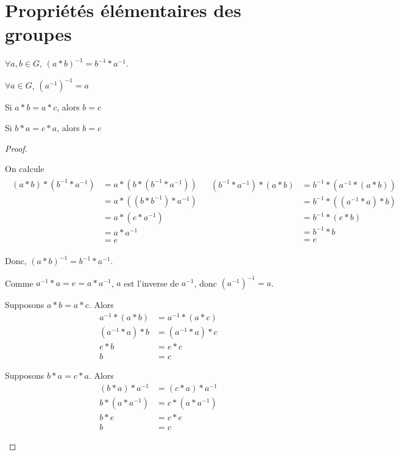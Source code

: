 \documentclass{report}
\theoremstyle{definition}
\theoremstyle{remark}
\begin{document}
	\section*{Propri\'et\'es \'el\'ementaires des groupes}
	\begin{nlist}
		\item $\forall a,b \in G$, $(a*b)^{-1} = b^{-1}*a^{-1}$.
		\item $\forall a \in G$, $(a^{-1})^{-1}=a$
		\item Si $a*b=a*c$, alors $b=c$
		\item Si $b*a=c*a$, alors $b=c$
	\end{nlist}
	\begin{proof}~

		\begin{nlist}
			\item On calcule
			\begin{align*}
				\begin{split}
					(a*b)*(b^{-1}*a^{-1})&= a*(b*(b^{-1}*a^{-1}))\\
					&= a*((b*b^{-1})*a^{-1})\\
					&= a*(e*a^{-1})\\
					&= a*a^{-1}\\
					&= e
				\end{split}
				&
				\begin{split}
					(b^{-1}*a^{-1})*(a*b)&= b^{-1}*(a^{-1}*(a*b))\\
					&= b^{-1}*((a^{-1}*a)*b)\\
					&= b^{-1}*(e*b)\\
					&= b^{-1}*b\\
					&= e
				\end{split}
			\end{align*}

			Donc, $(a*b)^{-1} = b^{-1}*a^{-1}$.
			\item Comme $a^{-1}*a=e=a*a^{-1}$, $a$ est l'inverse de $a^{-1}$, donc $\left( a^{-1} \right)^{-1}=a$.
			\item Supposons $a*b=a*c$. Alors
			\begin{align*}
				a^{-1}*(a*b)&= a^{-1}*(a*c)\\
				(a^{-1}*a)*b&= (a^{-1}*a)*c\\
				e*b&= e*c\\
				b&= c
			\end{align*}
			\item Supposons $b*a=c*a$. Alors
			\begin{align*}
				(b*a)*a^{-1}&= (c*a)*a^{-1}\\
				b*(a*a^{-1})&= c*(a*a^{-1})\\
				b*e&= c*e\\
				b&= c
			\end{align*}
		\end{nlist}
	\end{proof}
\end{document}
